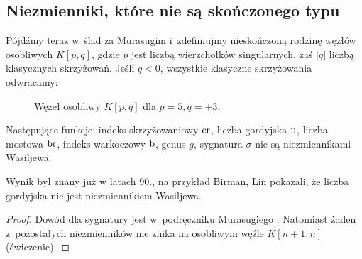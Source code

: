
\subsection{Niezmienniki, które nie są skończonego typu}
Pójdźmy teraz w~ślad za Murasugim i~zdefiniujmy nieskończoną rodzinę węzłów osobliwych $K[p, q]$, gdzie $p$ jest liczbą wierzchołków singularnych, zaś $|q|$ liczbą klasycznych skrzyżowań.
Jeśli $q < 0$, wszystkie klasyczne skrzyżowania odwracamy:
\begin{figure}[H]
    \centering
\begin{comment}
    \begin{tikzpicture}[baseline=-0.65ex, scale=0.1]
    \begin{knot}[clip width=5, end tolerance=1pt, flip crossing/.list={2}]
        \draw[thick] (5, 0) [in=-60, out=-120] to (-5, 0) [in=60, out=120] to (-15, 0) [in=-60, out=-120] to (-25, 0) [in=60, out=120] to (-35, 0) [in=180, out=-120] to (-35, -10);
        \draw[thick] (5, 0) [in=60, out=120] to (-5, 0) [in=-60, out=-120] to (-15, 0) [in=60, out=120] to (-25, 0) [in=-60, out=-120] to (-35, 0) [in=-180, out=120] to (-35, 10);
        \strand[thick] (5, 0) [in=120, out=60] to (15, 0) [in=-120, out=-60] to (25, 0) [in=120, out=60] to (35, 0) [in=0, out=-60] to (35, -10);
        \strand[thick] (5, 0) [in=-120, out=-60] to (15, 0) [in=120, out=60] to (25, 0) [in=-120, out=-60] to (35, 0) [in=0, out=60] to (35, 10);
        \draw[thick,Latex-] (-35, 10) to (35, 10);
        \draw[thick,Latex-] (-35, -10) to (35, -10);
        \draw[black,fill=black] (5,0) circle (0.5);
        \draw[black,fill=black] (-5,0) circle (0.5);
        \draw[black,fill=black] (-15,0) circle (0.5);
        \draw[black,fill=black] (-25,0) circle (0.5);
        \draw[black,fill=black] (-35,0) circle (0.5);
    \end{knot}
    \end{tikzpicture}
\end{comment}
    \caption{Węzeł osobliwy $K[p, q]$ dla $p = 5, q = +3$.}
\end{figure}

\begin{proposition}
%
%
%
%
%
%
    Następujące funkcje: indeks skrzyżowaniowy $\operatorname{cr}$, liczba gordyjska $\operatorname{u}$, liczba mostowa $\operatorname{br}$, indeks warkoczowy $\operatorname{b}$, genus $g$, sygnatura $\sigma$ nie są niezmiennikami Wasiljewa.
\end{proposition}

Wynik był znany już w latach 90., na przykład Birman, Lin \cite{birman1993} pokazali, że liczba gordyjska nie jest niezmiennikiem Wasiljewa.
%
%

\begin{proof}
    Dowód dla sygnatury jest w~podręczniku Murasugiego \cite[s. 312]{murasugi1996}.
    Natomiast żaden z~pozostałych niezmienników nie znika na osobliwym węźle $K[n+1, n]$ (ćwiczenie).
\end{proof}

